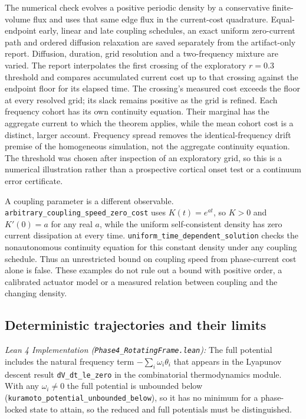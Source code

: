 \documentclass{article}
\begin{document}
The numerical check evolves a positive periodic density by a conservative
finite-volume flux and uses that same edge flux in the current-cost quadrature.
Equal-endpoint early, linear and late coupling schedules, an exact uniform
zero-current path and ordered diffusion relaxation are saved separately from
the artifact-only report. Diffusion, duration, grid resolution and a
two-frequency mixture are varied. The report interpolates the first crossing
of the exploratory $r=0.3$ threshold and compares accumulated current cost
up to that crossing against the endpoint floor for its elapsed time. The
crossing's measured cost exceeds the floor at every resolved grid; its slack
remains positive as the grid is refined. Each frequency cohort has its own
continuity equation. Their marginal has the aggregate current to which the
theorem applies, while the mean cohort cost is a distinct, larger account.
Frequency spread removes the identical-frequency drift premise of the
homogeneous simulation, not the aggregate continuity equation. The threshold
was chosen after inspection of an exploratory grid, so this is a numerical
illustration rather than a prospective cortical onset test or a continuum
error certificate.

A coupling parameter is a different observable.
\nolinkurl{arbitrary_coupling_speed_zero_cost}
uses $K(t)=e^{at}$, so $K>0$ and $K'(0)=a$ for any real $a$, while the uniform
self-consistent density has zero current dissipation at every time.
\nolinkurl{uniform_time_dependent_solution}
checks the nonautonomous continuity equation for this constant density under
any coupling schedule. Thus an unrestricted bound on coupling speed from
phase-current cost alone is false. These examples do not rule out a bound with
positive order, a calibrated actuator model or a measured relation between
coupling and the changing density.

\subsection{Deterministic trajectories and their limits}

\textit{Lean 4 Implementation (\nolinkurl{Phase4_RotatingFrame.lean}):} The full potential includes the natural frequency term $-\sum_i \omega_i\theta_i$ that appears in the Lyapunov descent result \nolinkurl{dV_dt_le_zero} in the combinatorial thermodynamics module. With any $\omega_i \ne 0$ the full potential is unbounded below (\nolinkurl{kuramoto_potential_unbounded_below}), so it has no minimum for a phase-locked state to attain, so the reduced and full potentials must be distinguished.
\end{document}
